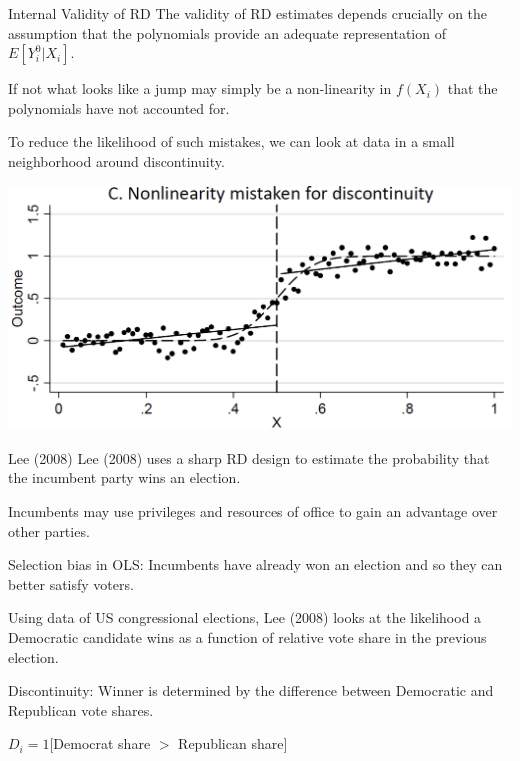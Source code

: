 \documentclass[handout]{beamer}
\begin{document}
\begin{frame}{Internal Validity of RD}
	The validity of RD estimates depends crucially on the assumption 	that the polynomials provide an adequate representation of $E[Y^0_i|X_i ]$.\medskip 
	
	If not what looks like a jump may simply be a non-linearity in $f(X_i)$
	that the polynomials have not accounted for.\medskip
	
	To reduce the likelihood of such mistakes, we can look at data in a small neighborhood around discontinuity.\medskip
	
\begin{center}
		\includegraphics[width=.7\linewidth]{./Figures/RDsharp1}
\end{center}

\end{frame}

\begin{frame}{Lee (2008)}
	Lee (2008) uses a sharp RD design to estimate the probability that the incumbent party wins an election.\medskip
	
	Incumbents may use privileges and resources of office to gain an advantage over other parties.\medskip
	
	Selection bias in OLS: Incumbents have already won an election and so they can better satisfy voters.\medskip
	
	Using data of US congressional elections, Lee (2008) looks at the likelihood a Democratic candidate wins as a function of relative vote share in the previous election.\medskip
	
	Discontinuity: Winner is determined by the difference between Democratic and Republican vote shares. 
	
	$D_i=1[$Democrat share $>$ Republican share$]$
\end{frame}
\end{document}
